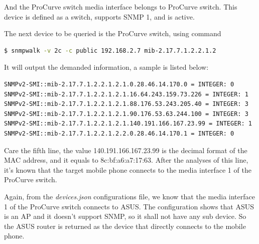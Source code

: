 And the ProCurve switch media interface belongs to ProCurve switch. This device is defined as a switch, supports SNMP 1, and is active.

The next device to be queried is the ProCurve switch, using command

\begin{lstlisting}[language=bash, caption={Query the ProCurve switch}]
$ snmpwalk -v 2c -c public 192.168.2.7 mib-2.17.7.1.2.2.1.2
\end{lstlisting}

It will output the demanded information, a sample is listed below:

\begin{lstlisting}
SNMPv2-SMI::mib-2.17.7.1.2.2.1.2.1.0.28.46.14.170.0 = INTEGER: 0
SNMPv2-SMI::mib-2.17.7.1.2.2.1.2.1.16.64.243.159.73.226 = INTEGER: 1
SNMPv2-SMI::mib-2.17.7.1.2.2.1.2.1.88.176.53.243.205.40 = INTEGER: 3
SNMPv2-SMI::mib-2.17.7.1.2.2.1.2.1.90.176.53.63.244.100 = INTEGER: 3
SNMPv2-SMI::mib-2.17.7.1.2.2.1.2.1.140.191.166.167.23.99 = INTEGER: 1
SNMPv2-SMI::mib-2.17.7.1.2.2.1.2.2.0.28.46.14.170.1 = INTEGER: 0
\end{lstlisting}

Care the fifth line, the value 140.191.166.167.23.99 is the decimal format of the MAC address, and it equals to 8c:bf:a6:a7:17:63. After the analyses of this line, it's known that the target mobile phone connects to the media interface 1 of the ProCurve switch.

Again, from the \textit{devices.json} configurations file, we know that the media interface 1 of the ProCurve switch connects to ASUS. The configuration shows that ASUS is an AP and it doesn't support SNMP, so it shall not have any sub device. So the ASUS router is returned as the device that directly connects to the mobile phone.
